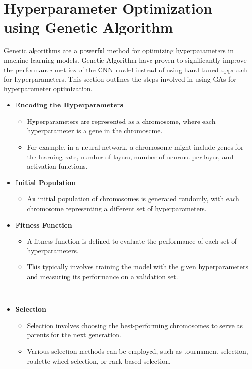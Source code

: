 \section{Hyperparameter Optimization using Genetic Algorithm}
Genetic algorithms are a powerful method for optimizing hyperparameters
in machine learning models. Genetic Algorithm have proven to significantly
improve the performance metrics of the CNN model instead of using hand tuned
approach for hyperparameters. This section outlines the steps involved in using
GAs for hyperparameter optimization\cite{9058307}.
\begin{itemize}
      \item \textbf{Encoding the Hyperparameters}
            \begin{itemize}
                  \item Hyperparameters are represented as a chromosome, where each hyperparameter is a
                        gene in the chromosome.
                  \item For example, in a neural network, a chromosome might include genes for the
                        learning rate, number of layers, number of neurons per layer, and activation
                        functions.
            \end{itemize}

      \item \textbf{Initial Population}
            \begin{itemize}
                  \item An initial population of chromosomes is generated randomly, with each
                        chromosome representing a different set of hyperparameters.
            \end{itemize}

      \item \textbf{Fitness Function}
            \begin{itemize}
                  \item A fitness function is defined to evaluate the performance of each set of
                        hyperparameters.
                  \item This typically involves training the model with the given hyperparameters and
                        measuring its performance on a validation set.
            \end{itemize}
      \\
      \item \textbf{Selection}
            \begin{itemize}
                  \item Selection involves choosing the best-performing chromosomes to serve as parents
                        for the next generation.
                  \item Various selection methods can be employed, such as tournament selection,
                        roulette wheel selection, or rank-based selection.
            \end{itemize}
            

\end{itemize}
